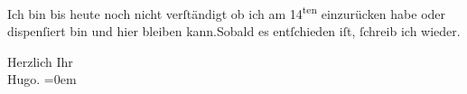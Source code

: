\pstart
           Ich bin bis heute noch nicht verſtändigt ob ich am {\pb}14\textsuperscript{ten}
               einzurücken habe oder dispenſiert bin und hier bleiben kann.\hspace*{1.5em}Sobald es entſchieden iſt, ſchreib ich wieder.\pend
           
\pstart
           Herzlich Ihr{\\[\baselineskip]}\spacefill\mbox{Hugo.}\pend
           \leftskip=0em{}\endnumbering{}  
      